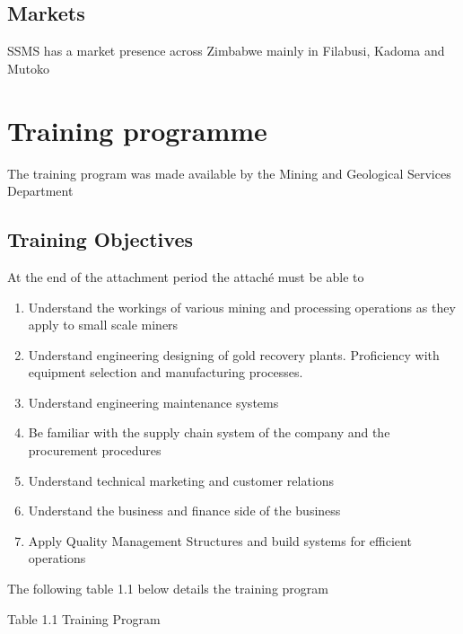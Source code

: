 \subsection{ Markets}

\noindent SSMS has a market presence across Zimbabwe mainly in Filabusi, Kadoma and Mutoko


\section{ Training programme}

\noindent The training program was made available by the Mining and Geological Services Department 


\subsection{ Training Objectives}

\noindent At the end of the attachment period the attach\'{e} must be able to 

\begin{enumerate}
\item  Understand the workings of various mining and processing operations as they apply to small scale miners

\item  Understand engineering designing of gold recovery plants. Proficiency with equipment selection and manufacturing processes. 

\item  Understand engineering maintenance systems

\item  Be familiar with the supply chain system of the company and the procurement procedures

\item  Understand technical marketing and customer relations

\item  Understand the business and finance side of the business

\item  Apply Quality Management Structures and build systems for efficient operations
\end{enumerate}

\noindent The following table 1.1 below details the training program

\noindent Table 1.1 Training Program

